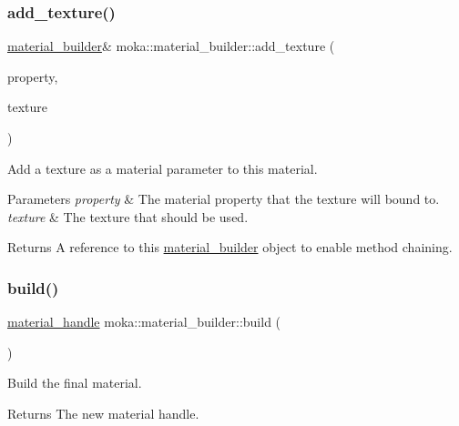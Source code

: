 \subsubsection{\texorpdfstring{add\_texture()}{add\_texture()}}
{\footnotesize\ttfamily \mbox{\hyperlink{classmoka_1_1material__builder}{material\+\_\+builder}}\& moka\+::material\+\_\+builder\+::add\+\_\+texture (\begin{DoxyParamCaption}\item[{\mbox{\hyperlink{namespacemoka_aa5549e36b096ef61aaa3dbcdade25195}{material\+\_\+property}}}]{property,  }\item[{\mbox{\hyperlink{structmoka_1_1texture__handle}{texture\+\_\+handle}}}]{texture }\end{DoxyParamCaption})}



Add a texture as a material parameter to this material. 


\begin{DoxyParams}{Parameters}
{\em property} & The material property that the texture will bound to. \\
\hline
{\em texture} & The texture that should be used. \\
\hline
\end{DoxyParams}
\begin{DoxyReturn}{Returns}
A reference to this \mbox{\hyperlink{classmoka_1_1material__builder}{material\+\_\+builder}} object to enable method chaining. 
\end{DoxyReturn}
\mbox{\label{classmoka_1_1material__builder_a38aeb602a54aff9711e14ed59d686d86}} 
\subsubsection{\texorpdfstring{build()}{build()}}
{\footnotesize\ttfamily \mbox{\hyperlink{structmoka_1_1material__handle}{material\+\_\+handle}} moka\+::material\+\_\+builder\+::build (\begin{DoxyParamCaption}{ }\end{DoxyParamCaption})}



Build the final material. 

\begin{DoxyReturn}{Returns}
The new material handle. 
\end{DoxyReturn}
\mbox{\label{classmoka_1_1material__builder_a7cf5ec782ed06d8b1b74788400ad55d1}} 
